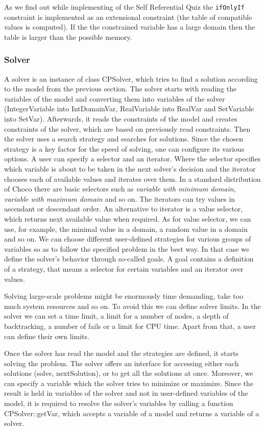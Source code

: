 As we find out while implementing of the Self Referential Quiz the \texttt{ifOnlyIf} constraint
is implemented as an extensional constraint (the table of compatible values is computed).
If the the constrained variable has a large domain then the table is larger than
the possible memory.

\subsubsection{Solver}
A solver is an instance of class CPSolver, which tries to find a solution according to the model
from the previous section. The solver starts with reading the variables of the model and 
converting them into variables of the solver (IntegerVariable into IntDomainVar, RealVariable into RealVar and SetVariable into SetVar).
Afterwards, it reads the constraints of the model and creates constraints of the solver, which are based on previously read constraints.
Then the solver uses a search strategy and searches for solutions. Since the chosen strategy
is a key factor for the speed of solving, one can configure its various options.
A user can specify a selector and an iterator. Where the selector specifies which variable
is about to be taken in the next solver's decision and the iterator chooses each of available values
and iterates over them. In a standard distribution of Choco there are basic selectors such as 
{\em variable with minimum domain}, {\em variable with maximum domain} and so on. 
The iterators can try values in ascendant or descendant order. An alternative to iterator
is a value selector, which returns next available value when required. As for value selector,
we can use, for example, the minimal value in a domain, a random value in a domain and so on. We can choose
different user-defined strategies for various groups of variables so as to follow the specified problem
in the best way. In that case we define the solver's behavior through so-called goals. A goal
contains a definition of a strategy, that means a selector for certain variables and an iterator over values.

Solving large-scale problems might be enormously time demanding, take too much system resources and so on.
To avoid this we can define solver limits. In the solver we can set a time limit, a limit for a number of nodes, 
a depth of backtracking, a number of fails or a limit for CPU time. Apart from that, a user can define their own limits. 

Once the solver has read the model and the strategies are defined, it starts solving the problem.
The solver offers an interface for accessing either each solutions (solve, nextSolution), or to get
all the solutions at once. Moreover, we can specify a variable which the solver tries to minimize or maximize.
Since the result is held in variables of the solver and not in user-defined variables of the model,
it is required to resolve the solver's variables by calling a function CPSolver::getVar, which accepts a variable of a model
and returns a variable of a solver.

